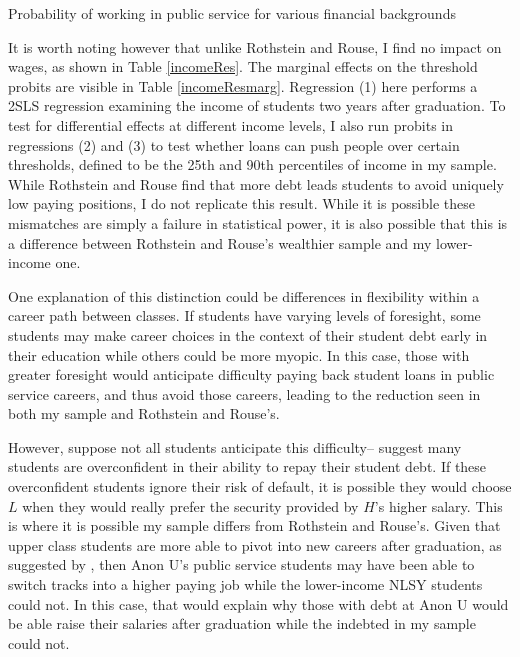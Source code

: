 \documentclass[12pt]{article}
\newcommand{\regs}{../Analysis/Regressions/Output/}
\begin{document}
	\begin{table}
		\centering 
		\caption{Probability of working in public service for various financial backgrounds}
		
		\label{probest}
	\end{table}
	
	It is worth noting however that unlike Rothstein and Rouse, I find no impact on wages, as shown in Table \ref{incomeRes}. The marginal effects on the threshold probits are visible in Table \ref{incomeResmarg}. Regression (1) here performs a 2SLS regression examining the income of students two years after graduation. To test for differential effects at different income levels, I also run probits in regressions (2) and (3) to test whether loans can push people over certain thresholds, defined to be the 25th and 90th percentiles of income in my sample. While Rothstein and Rouse find that more debt leads students to avoid uniquely low paying positions, I do not replicate this result. While it is possible these mismatches are simply a failure in statistical power, it is also possible that this is a difference between Rothstein and Rouse's wealthier sample and my lower-income one. 
	
	One explanation of this distinction could be differences in flexibility within a career path between classes. If students have varying levels of foresight, some students may make career choices in the context of their student debt early in their education while others could be more myopic. In this case, those with greater foresight would anticipate difficulty paying back student loans in public service careers, and thus avoid those careers, leading to the reduction seen in both my sample and Rothstein and Rouse's. 
	
	However, suppose not all students anticipate this difficulty--\textcite{smith2013} suggest many students are overconfident in their ability to repay their student debt. If these overconfident students ignore their risk of default, it is possible they would choose $L$ when they would really prefer the security provided by $H$'s higher salary. This is where it is possible my sample differs from Rothstein and Rouse's. Given that upper class students are more able to pivot into new careers after graduation, as suggested by \textcite{mcleod2009}, then Anon U's public service students may have been able to switch tracks into a higher paying job while the lower-income NLSY students could not. In this case, that would explain why those with debt at Anon U would be able raise their salaries after graduation while the indebted in my sample could not.
	
\end{document}
